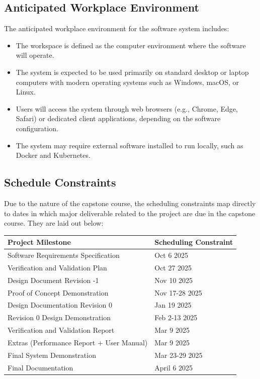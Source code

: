 \documentclass[12pt]{article}
\begin{document}
\subsection{Anticipated Workplace Environment}

The anticipated workplace environment for the software system includes:

\begin{itemize}
    \item The workspace is defined as the computer environment where the software will operate.
    \item The system is expected to be used primarily on standard desktop or laptop computers with modern operating systems such as Windows, macOS, or Linux.
    \item Users will access the system through web browsers (e.g., Chrome, Edge, Safari) or dedicated client applications, depending on the software configuration.
    \item The system may require external software installed to run locally, such as Docker and Kubernetes.
\end{itemize}

\subsection{Schedule Constraints}

\par{Due to the nature of the capstone course, the scheduling constraints
map directly to dates in which major deliverable related to the project are due in the capstone course.
They are laid out below:}

\begin{tabular}{|m{5cm}|m{10cm}|}
    \hline
    Project Milestone & Scheduling Constraint\\
    \hline
    Software Requirements Specification & Oct 6 2025\\
    \hline
    Verification and Validation Plan & Oct 27 2025\\
    \hline
    Design Document Revision -1 & Nov 10 2025\\
    \hline
    Proof of Concept Demonstration & Nov 17-28 2025\\
    \hline
    Design Documentation Revision 0 & Jan 19 2025\\
    \hline
    Revision 0 Design Demonstration & Feb 2-13 2025\\
    \hline
    Verification and Validation Report & Mar 9 2025\\
    \hline
    Extras (Performance Report + User Manual) & Mar 9 2025\\
    \hline
    Final System Demonstration & Mar 23-29 2025\\
    \hline
    Final Documentation & April 6 2025\\
    \hline
\end{tabular}
\end{document}
